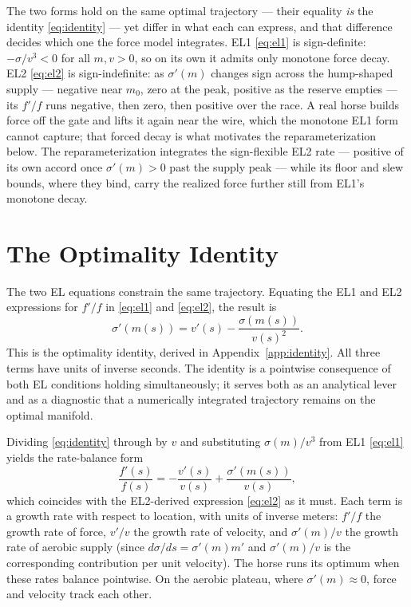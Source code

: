\documentclass[11pt]{article}
\begin{document}
The two forms hold on the same optimal trajectory --- their equality \emph{is} the identity \eqref{eq:identity} --- yet differ in what each can express, and that difference decides which one the force model integrates. EL1 \eqref{eq:el1} is sign-definite: $-\sigma/v^3 < 0$ for all $m, v > 0$, so on its own it admits only monotone force decay. EL2 \eqref{eq:el2} is sign-indefinite: as $\sigma'(m)$ changes sign across the hump-shaped supply --- negative near $m_0$, zero at the peak, positive as the reserve empties --- its $f'/f$ runs negative, then zero, then positive over the race. A real horse builds force off the gate and lifts it again near the wire, which the monotone EL1 form cannot capture; that forced decay is what motivates the reparameterization below. The reparameterization integrates the sign-flexible EL2 rate --- positive of its own accord once $\sigma'(m) > 0$ past the supply peak --- while its floor and slew bounds, where they bind, carry the realized force further still from EL1's monotone decay.

\section{The Optimality Identity}\label{sec:identity}

The two EL equations constrain the same trajectory. Equating the EL1 and EL2 expressions for $f'/f$ in \eqref{eq:el1} and \eqref{eq:el2}, the result is
\begin{equation}\label{eq:identity}
\sigma'(m(s)) = v'(s) - \frac{\sigma(m(s))}{v(s)^2}.
\end{equation}
This is the optimality identity, derived in Appendix~\ref{app:identity}. All three terms have units of inverse seconds. The identity is a pointwise consequence of both EL conditions holding simultaneously; it serves both as an analytical lever and as a diagnostic that a numerically integrated trajectory remains on the optimal manifold.

Dividing \eqref{eq:identity} through by $v$ and substituting $\sigma(m)/v^3$ from EL1 \eqref{eq:el1} yields the rate-balance form
\begin{equation}
\frac{f'(s)}{f(s)} = - \frac{v'(s)}{v(s)} + \frac{\sigma'(m(s))}{v(s)},
\end{equation}
which coincides with the EL2-derived expression \eqref{eq:el2} as it must. Each term is a growth rate with respect to location, with units of inverse meters: $f'/f$ the growth rate of force, $v'/v$ the growth rate of velocity, and $\sigma'(m)/v$ the growth rate of aerobic supply (since $d\sigma/ds = \sigma'(m) m'$ and $\sigma'(m)/v$ is the corresponding contribution per unit velocity). The horse runs its optimum when these rates balance pointwise. On the aerobic plateau, where $\sigma'(m) \approx 0$, force and velocity track each other.
\end{document}
